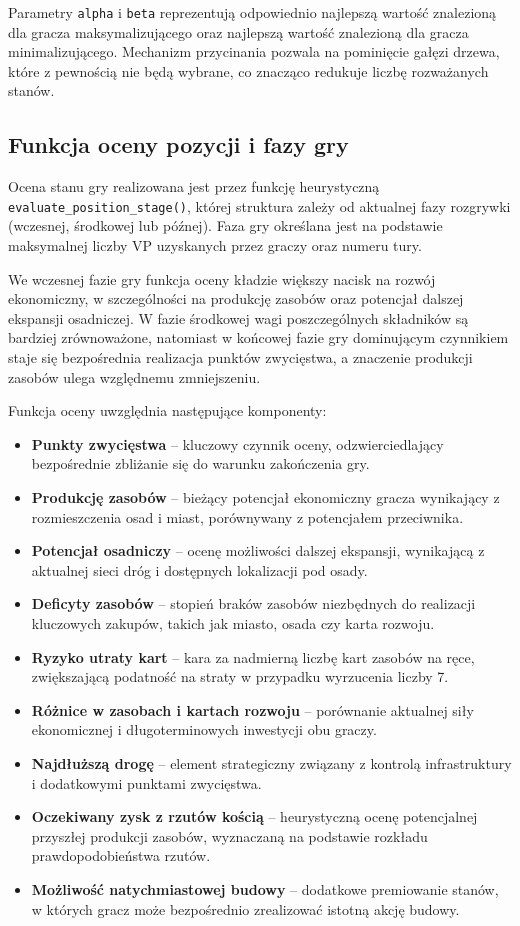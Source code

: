 \documentclass[polish,inz,longabstract]{iithesis}
\begin{document}
Parametry \texttt{alpha} i \texttt{beta} reprezentują odpowiednio najlepszą wartość znalezioną dla gracza maksymalizującego oraz najlepszą wartość znalezioną dla gracza minimalizującego. Mechanizm przycinania pozwala na pominięcie gałęzi drzewa, które z pewnością nie będą wybrane, co znacząco redukuje liczbę rozważanych stanów.

\subsection{Funkcja oceny pozycji i fazy gry}

Ocena stanu gry realizowana jest przez funkcję heurystyczną \newline \texttt{evaluate\_position\_stage()}, której struktura zależy od aktualnej fazy rozgrywki (wczesnej, środkowej lub późnej). Faza gry określana jest na podstawie maksymalnej liczby VP uzyskanych przez graczy oraz numeru tury.

We wczesnej fazie gry funkcja oceny kładzie większy nacisk na rozwój ekonomiczny, w szczególności na produkcję zasobów oraz potencjał dalszej ekspansji osadniczej. W fazie środkowej wagi poszczególnych składników są bardziej zrównoważone, natomiast w końcowej fazie gry dominującym czynnikiem staje się bezpośrednia realizacja punktów zwycięstwa, a znaczenie produkcji zasobów ulega względnemu zmniejszeniu.

Funkcja oceny uwzględnia następujące komponenty:

\begin{itemize}
\item \textbf{Punkty zwycięstwa} – kluczowy czynnik oceny, odzwierciedlający bezpośrednie zbliżanie się do warunku zakończenia gry.
\item \textbf{Produkcję zasobów} – bieżący potencjał ekonomiczny gracza wynikający z rozmieszczenia osad i miast, porównywany z potencjałem przeciwnika.
\item \textbf{Potencjał osadniczy} – ocenę możliwości dalszej ekspansji, wynikającą z aktualnej sieci dróg i dostępnych lokalizacji pod osady.
\item \textbf{Deficyty zasobów} – stopień braków zasobów niezbędnych do realizacji kluczowych zakupów, takich jak miasto, osada czy karta rozwoju.
\item \textbf{Ryzyko utraty kart} – kara za nadmierną liczbę kart zasobów na ręce, zwiększającą podatność na straty w przypadku wyrzucenia liczby 7.
\item \textbf{Różnice w zasobach i kartach rozwoju} – porównanie aktualnej siły ekonomicznej i długoterminowych inwestycji obu graczy.
\item \textbf{Najdłuższą drogę} – element strategiczny związany z kontrolą infrastruktury i dodatkowymi punktami zwycięstwa.
\item \textbf{Oczekiwany zysk z rzutów kością} – heurystyczną ocenę potencjalnej przyszłej produkcji zasobów, wyznaczaną na podstawie rozkładu prawdopodobieństwa rzutów.
\item \textbf{Możliwość natychmiastowej budowy} – dodatkowe premiowanie stanów, w których gracz może bezpośrednio zrealizować istotną akcję budowy.
\end{itemize}
\end{document}
